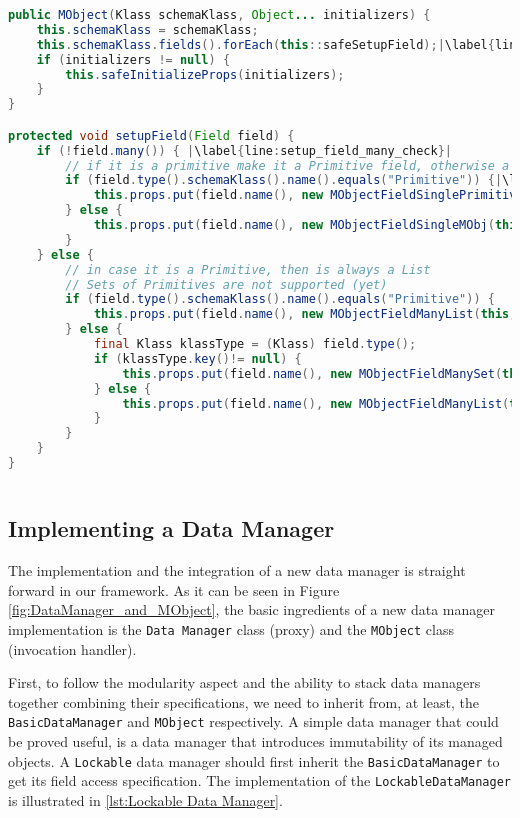 \begin{sourcecode} [H]
	\begin{lstlisting}[language=Java, escapechar=|]
public MObject(Klass schemaKlass, Object... initializers) {
	this.schemaKlass = schemaKlass;
	this.schemaKlass.fields().forEach(this::safeSetupField);|\label{line:setup_fields}|
	if (initializers != null) {
		this.safeInitializeProps(initializers);
	}
}

protected void setupField(Field field) {
	if (!field.many()) { |\label{line:setup_field_many_check}|
		// if it is a primitive make it a Primitive field, otherwise a reference (managed object)
		if (field.type().schemaKlass().name().equals("Primitive")) {|\label{line:instanceof}|
			this.props.put(field.name(), new MObjectFieldSinglePrimitive(this, field));
		} else {
			this.props.put(field.name(), new MObjectFieldSingleMObj(this, field));
		}
	} else {
		// in case it is a Primitive, then is always a List
		// Sets of Primitives are not supported (yet)
		if (field.type().schemaKlass().name().equals("Primitive")) {
			this.props.put(field.name(), new MObjectFieldManyList(this, field));
		} else {
			final Klass klassType = (Klass) field.type();
			if (klassType.key()!= null) {
				this.props.put(field.name(), new MObjectFieldManySet(this, field));
			} else {
				this.props.put(field.name(), new MObjectFieldManyList(this, field));
			}
		}
	}
}
	\end{lstlisting}
	\caption{MObject: setup fields}
	\label{lst:setup_fields}
\end{sourcecode}

\subsection{Implementing a Data Manager}\label{Implementing a Data Manager}
The implementation and the integration of a new data manager is straight forward in our framework.
As it can be seen in Figure \ref{fig:DataManager_and_MObject}, the basic ingredients of a new data manager implementation is the \texttt{Data Manager} class (proxy) and the \texttt{MObject} class (invocation handler).

First, to follow the modularity aspect and the ability to stack data managers together combining their specifications, we need to inherit from, at least, the \texttt{BasicDataManager} and \texttt{MObject} respectively.
A simple data manager that could be proved useful, is a data manager that introduces immutability of its managed objects.
A \texttt{Lockable} data manager should first inherit the \texttt{BasicDataManager} to get its field access specification.
The implementation of the \texttt{LockableDataManager} is illustrated in \ref{lst:Lockable Data Manager}.

